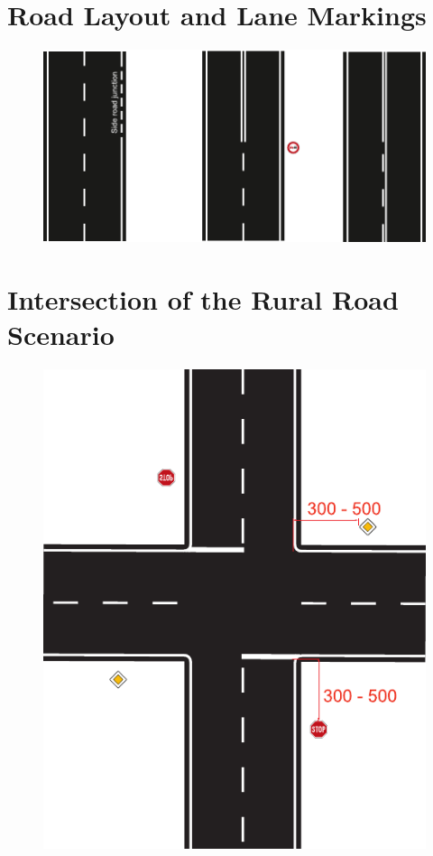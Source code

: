 \section{Road Layout and Lane Markings}
\label{fig_road_layout}
\begin{figure}[H]
	\begin{center}
		\centering\includegraphics[]{graphics/Abb_4_road_layout}
	\end{center}
\end{figure}

\section{Intersection of the Rural Road Scenario}
\label{fig_intersection_rural}
\begin{figure}[H]
	\begin{center}
		\centering\includegraphics[]{graphics/Abb_5_intersection}
	\end{center}
\end{figure}

